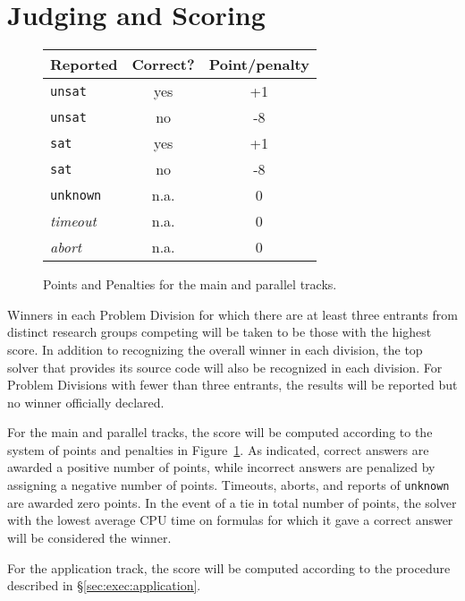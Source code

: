 \documentclass[12pt]{article}
\begin{document}
\section{Judging and Scoring}
\label{sec:judging}

\begin{figure}
\begin{center}
\begin{tabular}{|l|c|c|}
\hline \textbf{Reported} & \textbf{Correct?} &
\textbf{Point/penalty}\\ \hline \texttt{unsat} & yes & +1 \\ \hline
\texttt{unsat} & no & -8 \\ \hline \texttt{sat} & yes & +1 \\ \hline
\texttt{sat} & no & -8 \\ \hline \texttt{unknown} & n.a. & 0 \\ \hline
\emph{timeout} & n.a. & 0 \\ \hline
\emph{abort} & n.a. & 0 \\ \hline
\end{tabular}
\end{center}
\caption{\label{fig:points}Points and Penalties for the main and parallel tracks.}
\end{figure}

Winners in each Problem Division for which there are at least three
entrants from distinct research groups competing will be taken to be
those with the highest score. In addition to recognizing the overall
winner in each division, the top solver that provides its source code will also be
recognized in each division.  
For Problem Divisions with fewer than three
entrants, the results will be reported but no winner officially
declared.

For the main and parallel tracks, the score will be computed according to the system of points and
penalties in Figure~\ref{fig:points}. 
As indicated, correct answers
are awarded a positive number of points, while incorrect answers are
penalized by assigning a negative number of points.  Timeouts, aborts,
and reports of \texttt{unknown} are awarded zero points.
%
In the event of a tie
in total number of points, the solver with the lowest average CPU time
on formulas for which it gave a correct answer will be
considered the winner.  

For the application track, the score will be computed according to the procedure described in \S\ref{sec:exec:application}.

\end{document}
